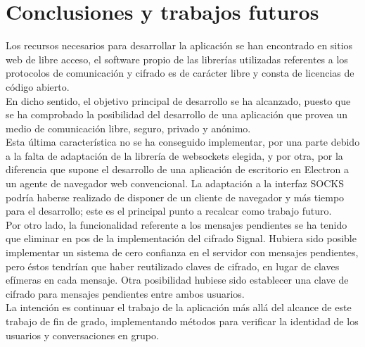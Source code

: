 \chapter{Conclusiones y trabajos futuros}

Los recursos necesarios para desarrollar la aplicación se han encontrado en sitios web de libre acceso, el software propio de las librerías utilizadas referentes a los protocolos de comunicación y cifrado es de carácter libre y consta de licencias de código abierto. \\

En dicho sentido, el objetivo principal de desarrollo se ha alcanzado, puesto que se ha comprobado la posibilidad del desarrollo de una aplicación que provea un medio de comunicación libre, seguro, privado y anónimo. \\ 

Esta última característica no se ha conseguido implementar, por una parte debido a la falta de adaptación de la librería de websockets elegida, y por otra, por la diferencia que supone el desarrollo de una aplicación de escritorio en Electron a un agente de navegador web convencional. La adaptación a la interfaz SOCKS podría haberse realizado de disponer de un cliente de navegador y más tiempo para el desarrollo; este es el principal punto a recalcar como trabajo futuro. \\

Por otro lado, la funcionalidad referente a los mensajes pendientes se ha tenido que eliminar en pos de la implementación del cifrado Signal. Hubiera sido posible implementar un sistema de cero confianza en el servidor con mensajes pendientes, pero éstos tendrían que haber reutilizado claves de cifrado, en lugar de claves efímeras en cada mensaje. Otra posibilidad hubiese sido establecer una clave de cifrado para mensajes pendientes entre ambos usuarios. \\

La intención es continuar el trabajo de la aplicación más allá del alcance de este trabajo de fin de grado, implementando métodos para verificar la identidad de los usuarios y conversaciones en grupo. \\
